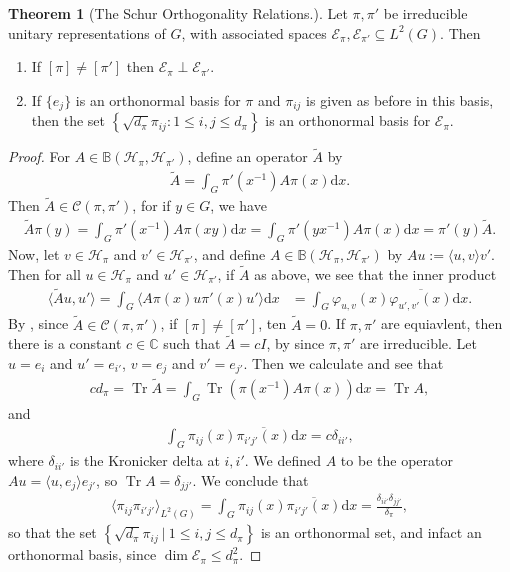 \documentclass[10pt,twoside,openany,final]{memoir}
\theoremstyle{definition}
\newtheorem{theorem}{Theorem}[chapter]
\theoremstyle{Break}
\newcommand{\C}{\mathbb{C}}
\renewcommand{\H}{\mathcal{H}}
\renewcommand{\d}{\mathrm{d}}
\DeclareMathOperator{\tr}{Tr}
\begin{document}
\begin{theorem}[The Schur Orthogonality Relations.]
	Let $\pi, \pi'$ be irreducible unitary representations of $G$, with associated spaces $\mathcal{E}_\pi , \mathcal{E}_{\pi'} \subseteq L^2(G)$. Then
	\begin{enumerate}
		\item If $[\pi]\neq[\pi']$ then $\mathcal{E}_\pi \perp \mathcal{E}_{\pi'}$.
		\item If $\{e_j\}$ is an orthonormal basis for $\pi$ and $\pi_{ij}$ is given as before in this basis, then the set $\left\{ \sqrt{d_\pi}\pi_{ij} : 1 \leq i,j \leq d_{\pi} \right\}$ is an orthonormal basis for $\mathcal{E}_{\pi}$.
	\end{enumerate}
	\label{5.8}
\end{theorem}
\begin{proof}
	For $A \in \mathbb{B}(\H_\pi,\H_{\pi'})$, define an operator $\tilde{A}$ by
	\begin{align*}
		\tilde{A}=\int_G \pi'(x^{-1}) A \pi(x) \d x.
	\end{align*}
	Then $\tilde{A} \in \mathcal{C}(\pi,\pi')$, for if $y \in G$, we have
	\begin{align*}
		\tilde{A}\pi(y)=\int_G \pi'(x^{-1}) A \pi(xy) \d x = \int_G \pi'(yx^{-1})A \pi(x) \d x = \pi'(y) \tilde{A}.
	\end{align*}
	Now, let $v \in \H_\pi$ and $v' \in \H_{\pi'}$, and define $A \in \mathbb{B}(\H_\pi,\H_{\pi'})$ by $Au:=\langle u,v \rangle v'$. Then for all $u \in \H_\pi$ and $u' \in \H_{\pi'}$, if $\tilde{A}$ as above, we see that the inner product
	\begin{align*}
		\langle \tilde{A}u,u'\rangle = \int_G \langle A \pi(x) u \pi'(x) u'\rangle \d x&= \int_{G} \varphi_{u,v}(x) \overline{\varphi_{u',v'}(x)} \d x.	
	\end{align*}
	By , since $\tilde{A} \in \mathcal{C}(\pi,\pi')$, if $[\pi]\neq [\pi']$, ten $\tilde{A}=0$. If $\pi,\pi'$ are equiavlent, then there is a constant $c\in \C$ such that $\tilde{A}=cI$, by  since $\pi,\pi'$ are irreducible. Let $u=e_i$ and $u'=e_{i'}$, $v=e_j$ and $v' =e_{j'}$. Then we calculate and see that 
	\begin{align*}	
	cd_\pi = \tr \tilde{A} = \int_{G } \tr\left( \pi(x^{-1}) A \pi(x) \right)\d x = \tr A,
\end{align*}
and 
\begin{align*}
	\int_{G}\pi_{ij}(x) \overline{\pi_{i'j'}(x)} \d x = c \delta_{ii'},
\end{align*}
where $\delta_{ii'}$ is the Kronicker delta at $i,i'$. We defined $A$ to be the operator $Au=\langle u,e_j\rangle e_{j'}$, so $\tr A = \delta_{jj'}$.  We conclude that
\begin{align*}
	\langle \pi_{ij}\pi_{i'j'}\rangle_{L^2(G)}= \int_{G}\pi_{ij}(x) \overline{\pi_{i'j'}(x)}\d x = \frac{\delta_{ii'}\delta_{jj'}}{\delta_{\pi}},
\end{align*}
so that the set $\left\{ \sqrt{d_{\pi}}\pi_{ij} \ \big| \ 1 \leq i ,j \leq d_\pi \right\}$ is an orthonormal set, and infact an orthonormal basis, since $\dim \mathcal{E}_\pi \leq d_\pi^2$.
\end{proof}
\end{document}
